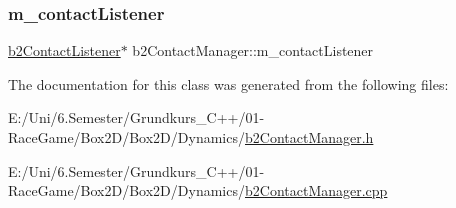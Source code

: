 \subsubsection{\texorpdfstring{m\_contactListener}{m\_contactListener}}
{\footnotesize\ttfamily \mbox{\hyperlink{classb2_contact_listener}{b2\+Contact\+Listener}}$\ast$ b2\+Contact\+Manager\+::m\+\_\+contact\+Listener}



The documentation for this class was generated from the following files\+:\begin{DoxyCompactItemize}
\item 
E\+:/\+Uni/6.\+Semester/\+Grundkurs\+\_\+\+C++/01-\/\+Race\+Game/\+Box2\+D/\+Box2\+D/\+Dynamics/\mbox{\hyperlink{b2_contact_manager_8h}{b2\+Contact\+Manager.\+h}}\item 
E\+:/\+Uni/6.\+Semester/\+Grundkurs\+\_\+\+C++/01-\/\+Race\+Game/\+Box2\+D/\+Box2\+D/\+Dynamics/\mbox{\hyperlink{b2_contact_manager_8cpp}{b2\+Contact\+Manager.\+cpp}}\end{DoxyCompactItemize}
